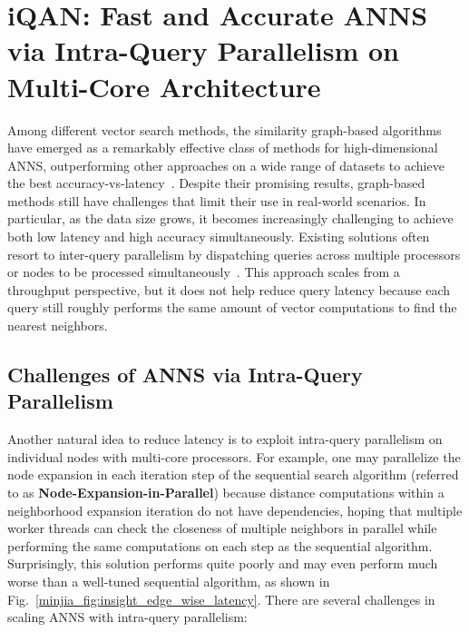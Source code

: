 \section{iQAN: Fast and Accurate ANNS via Intra-Query Parallelism on Multi-Core Architecture}
\label{minjia_sec:iqan}

Among different vector search methods, the similarity graph-based algorithms have emerged as a remarkably effective class of methods for high-dimensional ANNS, outperforming other approaches on a wide range of datasets to achieve the best accuracy-vs-latency~\cite{nsg,ann-benchmark,li2020approximate,echihabi2019return,wei2020analyticdb,wang2020deltapq,product-quantization,babenko2014inverted}. Despite their promising results, graph-based methods still have challenges that limit their use in real-world scenarios.
In particular, as the data size grows, it becomes increasingly challenging to achieve both low latency and high accuracy simultaneously. Existing solutions often resort to inter-query parallelism by dispatching queries across multiple processors or nodes to be processed simultaneously~\cite{nsg,bashyam2020fast}. This approach scales from a throughput perspective, but it does not help reduce query latency because each query still roughly performs the same amount of vector computations to find the nearest neighbors.

\subsection{Challenges of ANNS via Intra-Query Parallelism}

Another natural idea to reduce latency is to exploit intra-query parallelism on individual nodes with multi-core processors. For example, one may parallelize the node expansion in each iteration step of the sequential search algorithm (referred to as \textbf{Node-Expansion-in-Parallel}) because distance computations within a neighborhood expansion iteration do not have dependencies, hoping that multiple worker threads can check the closeness of multiple neighbors in parallel while performing the same computations on each step as the sequential algorithm.  Surprisingly, this solution performs quite poorly and may even perform much worse than a well-tuned sequential algorithm, as shown in Fig.~\ref{minjia_fig:insight_edge_wise_latency}. There are several challenges in scaling ANNS with intra-query parallelism:

